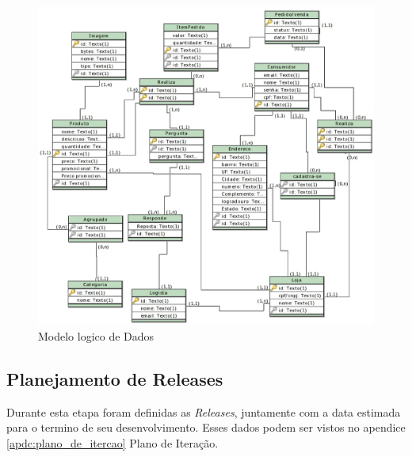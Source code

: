 \documentclass[a4paper,12pt]{monografia}
\begin{document}
\begin{figure}[H]
\centering
\includegraphics[width=15cm]{img/modelo_logico.eps}
\caption{Modelo logico de Dados}
\label{figura:modelo_logico}
\end{figure}

\subsection{Planejamento de Releases} %
\label{sub:planejamento_de_releases}

Durante esta etapa foram definidas as \textit{Releases}, juntamente com a data estimada para o termino de seu desenvolvimento. Esses dados podem ser vistos no apendice \ref{apdc:plano_de_itercao} Plano de Iteração.






\end{document}
